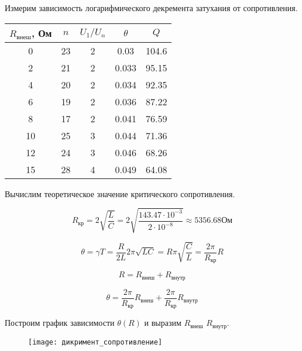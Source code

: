 	\noindent Измерим зависимость логарифмического декремента затухания от сопротивления. 

	\begin{table} [h!]
		\begin{center}
			\begin{tabular}{|c|c|c|c|c|}
				\hline
				$R_{\text{внеш}}$, Ом  & $n$  & $U_1/U_n$ & $\theta$ & $Q$     \\ \hline
				0  & 23 & 2     & 0.03  & 104.6 \\ \hline
				2  & 21 & 2     & 0.033 & 95.15 \\ \hline
				4  & 20 & 2     & 0.034 & 92.35 \\ \hline
				6  & 19 & 2     & 0.036 & 87.22 \\ \hline
				8  & 17 & 2     & 0.041 & 76.59 \\ \hline
				10 & 25 & 3     & 0.044 & 71.36 \\ \hline
				12 & 24 & 3     & 0.046 & 68.26 \\ \hline
				15 & 28 & 4     & 0.049 & 64.08 \\ \hline
			\end{tabular}
		\end{center}
	\end{table}

	\noindent Вычислим теоретическое значение критического сопротивления.
	
	\begin{equation*}
		R_{\text{кр}} = 2 \sqrt{\frac{L}{C}} = 2 \sqrt{\frac{143.47 \cdot 10^{-3}}{2 \cdot 10^{-8}}} \approx  5356.68 \text{Ом}
	\end{equation*}
	
	\begin{equation}
		\theta = \gamma T = \frac{R}{2 L} 2 \pi \sqrt{L C} = R \pi \sqrt{\frac{C}{L}} = \frac{2 \pi}{R_{\text{кр}}}R
	\end{equation}
	
	\begin{equation}
		R = R_{\text{внеш}} + R_{\text{внутр}}
	\end{equation}
	
	\begin{equation}
		\theta = \frac{2 \pi}{R_{\text{кр}}} R_{\text{внеш}} + \frac{2 \pi}{R_{\text{кр}}} R_{\text{внутр}}
	\end{equation}
	
	\noindent Построим график зависимости $\theta(R)$ и выразим $R_{\text{внеш}}$ $R_{\text{внутр}}$.
	
	\begin{figure}[h!]
		\centering
		\texttt{[image: дикримент\_сопротивление]}
	\end{figure}
	
